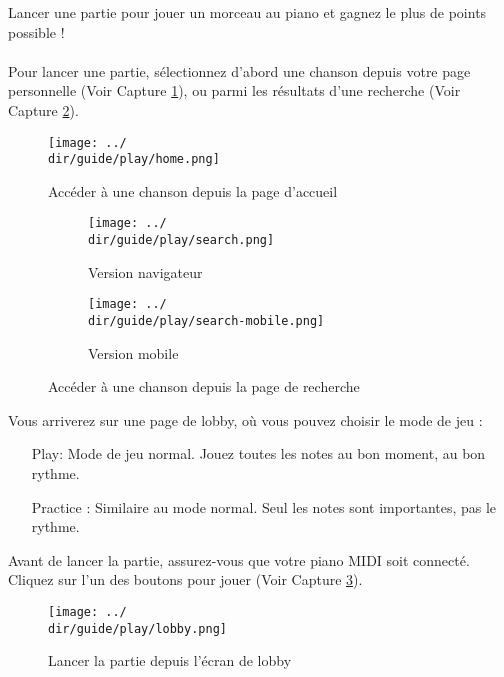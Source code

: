 Lancer une partie pour jouer un morceau au piano et gagnez le plus de points possible !
\\\\
Pour lancer une partie, sélectionnez d’abord une chanson depuis votre page personnelle (Voir Capture \ref{fig:access-song}), ou parmi les résultats d’une recherche (Voir Capture \ref{fig:search-song}).

\begin{figure}[H]
	\texttt{[image: ../\\dir/guide/play/home.png]}
	\caption{Accéder à une chanson depuis la page d'accueil}
	\label{fig:access-song}
\end{figure}

\begin{figure}[H]
	\begin{subfigure}[b]{0.7\textwidth}
		\texttt{[image: ../\\dir/guide/play/search.png]}
		\caption{Version navigateur}
	\end{subfigure}
	\begin{subfigure}[b]{0.25\textwidth}
		\texttt{[image: ../\\dir/guide/play/search-mobile.png]}
		\caption{Version mobile}
	\end{subfigure}
	\caption{Accéder à une chanson depuis la page de recherche}
	\label{fig:search-song}
\end{figure}

Vous arriverez sur une page de lobby, où vous pouvez choisir le mode de jeu :

\begin{itemize}
	\item[Play:] Mode de jeu normal. Jouez toutes les notes au bon moment, au bon rythme.
	\item[Practice]: Similaire au mode normal. Seul les notes sont importantes, pas le rythme.
\end{itemize}

Avant de lancer la partie, assurez-vous que votre piano MIDI soit connecté.
Cliquez sur l'un des boutons pour jouer (Voir Capture \ref{fig:choose-play-mode}).

\begin{figure}[H]
	\texttt{[image: ../\\dir/guide/play/lobby.png]}
	\caption{Lancer la partie depuis l'écran de lobby}
	\label{fig:choose-play-mode}
\end{figure}

